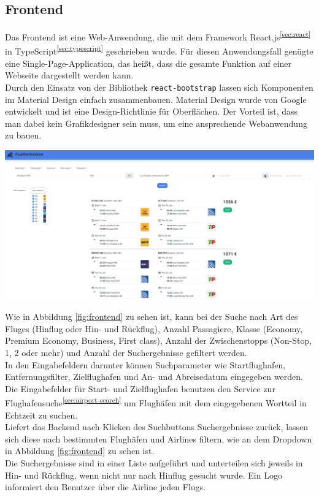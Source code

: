 \documentclass[12pt,twoside,a4paper]{article}
\let\OldTexttrademark\texttrademark
\renewcommand{\texttrademark}{\OldTexttrademark\xspace}%
\begin{document}
\subsection{Frontend}
Das Frontend ist eine Web-Anwendung, die mit dem Framework React.js\textsuperscript{\ref{sec:react}} in TypeScript\textsuperscript{\ref{sec:typescript}} geschrieben wurde. Für diesen Anwendungsfall genügte eine Single-Page-Application, das heißt, dass die gesamte Funktion auf einer Webseite dargestellt werden kann.\\
Durch den Einsatz von der Bibliothek \texttt{react-bootstrap} lassen sich Komponenten im Material Design einfach zusammenbauen. Material Design wurde von Google\texttrademark entwickelt und ist eine Design-Richtlinie für Oberflächen. Der Vorteil ist, dass man dabei kein Grafikdesigner sein muss, um eine ansprechende Webanwendung zu bauen.
\begin{center}
	\captionsetup{type=figure}
	\includegraphics[width=\textwidth]{images/frontend-screenshot}
	\label{fig:frontend}
\end{center}
Wie in Abbildung \ref{fig:frontend} zu sehen ist, kann bei der Suche nach Art des Fluges (Hinflug oder Hin- und Rückflug), Anzahl Passagiere, Klasse (Economy, Premium Economy, Business, First class), Anzahl der Zwischenstopps (Non-Stop, 1, 2 oder mehr) und Anzahl der Suchergebnisse gefiltert werden.\\
In den Eingabefeldern darunter können Suchparameter wie Startflughafen, Entfernungsfilter, Zielflughafen und An- und Abreisedatum eingegeben werden. Die Eingabefelder für Start- und Zielflughafen benutzen den Service zur Flughafensuche\textsuperscript{\ref{sec:airport-search}} um Flughäfen mit dem eingegebenen Wortteil in Echtzeit zu suchen.\\
Liefert das Backend nach Klicken des Suchbuttons Suchergebnisse zurück, lassen sich diese nach bestimmten Flughäfen und Airlines filtern, wie an dem Dropdown in Abbildung \ref{fig:frontend} zu sehen ist.\\
Die Suchergebnisse sind in einer Liste aufgeführt und unterteilen sich jeweils in Hin- und Rückflug, wenn nicht nur nach Hinflug gesucht wurde. Ein Logo informiert den Benutzer über die Airline jeden Flugs.
\newpage
\end{document}
